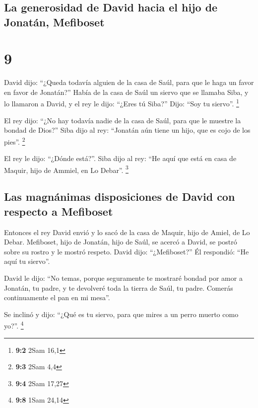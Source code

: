 \begin{paracol}{2}
{\subsection{La generosidad de David hacia el hijo de Jonatán,
Mefiboset}\label{la-generosidad-de-david-hacia-el-hijo-de-jonatuxe1n-mefiboset}}

\hypertarget{section-16}{%
\section{9}\label{section-16}}

 David dijo: ``¿Queda todavía alguien de la casa de Saúl,
para que le haga un favor en favor de Jonatán?''  Había de
la casa de Saúl un siervo que se llamaba Siba, y lo llamaron a David, y
el rey le dijo: ``¿Eres tú Siba?'' Dijo: ``Soy tu siervo''. \footnote{\textbf{9:2}
  2Sam 16,1}

 El rey dijo: ``¿No hay todavía nadie de la casa de Saúl,
para que le muestre la bondad de Dios?'' Siba dijo al rey: ``Jonatán aún
tiene un hijo, que es cojo de los pies''. \footnote{\textbf{9:3} 2Sam
  4,4}

 El rey le dijo: ``¿Dónde está?''. Siba dijo al rey: ``He
aquí que está en casa de Maquir, hijo de Ammiel, en Lo Debar''.
\footnote{\textbf{9:4} 2Sam 17,27}

\hypertarget{las-magnuxe1nimas-disposiciones-de-david-con-respecto-a-mefiboset}{%
\subsection{Las magnánimas disposiciones de David con respecto a
Mefiboset}\label{las-magnuxe1nimas-disposiciones-de-david-con-respecto-a-mefiboset}}

 Entonces el rey David envió y lo sacó de la casa de
Maquir, hijo de Amiel, de Lo Debar.  Mefiboset, hijo de
Jonatán, hijo de Saúl, se acercó a David, se postró sobre su rostro y le
mostró respeto. David dijo: ``¿Mefiboset?'' Él respondió: ``He aquí tu
siervo''.

 David le dijo: ``No temas, porque seguramente te mostraré
bondad por amor a Jonatán, tu padre, y te devolveré toda la tierra de
Saúl, tu padre. Comerás continuamente el pan en mi mesa''.

 Se inclinó y dijo: ``¿Qué es tu siervo, para que mires a
un perro muerto como yo?''. \footnote{\textbf{9:8} 1Sam 24,14}


\end{paracol}
